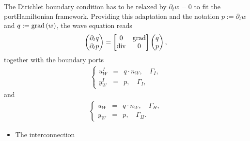 \documentclass[letterpaper,10pt,english]{sphinxmanual}
\begin{document}
\sphinxAtStartPar
The Dirichlet boundary condition has to be relaxed by
\(\partial_t w = 0\) to fit the port\sphinxhyphen{}Hamiltonian framework.
Providing this adaptation and the notation \(p := \partial_t w\) and
\(q := {\rm grad}\left(w\right)\), the wave equation reads
\begin{equation*}
\begin{split}\begin{pmatrix} \partial_t q \\ \partial_t p \end{pmatrix} =
\begin{bmatrix} 0 & {\rm grad} \\ {\rm div} & 0 \end{bmatrix}
\begin{pmatrix} q \\ p \end{pmatrix},\end{split}
\end{equation*}
\sphinxAtStartPar
together with the boundary ports
\begin{equation*}
\begin{split}\left\lbrace
\begin{array}{rcl}
u^I_W &=& q \cdot n_W, \quad \Gamma_I, \\
y^I_W &=& p, \quad \Gamma_I,
\end{array}
\right.\end{split}
\end{equation*}
\sphinxAtStartPar
and
\begin{equation*}
\begin{split}\left\lbrace
\begin{array}{rcl}
u_W &=& q \cdot n_W, \quad \Gamma_H, \\
y_W &=& p, \quad \Gamma_H.
\end{array}
\right.\end{split}
\end{equation*}\begin{itemize}
\item {} 
\sphinxAtStartPar
The interconnection

\end{itemize}
\end{document}
